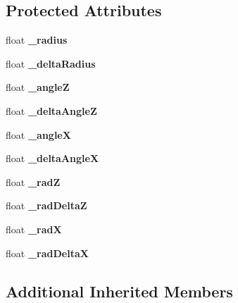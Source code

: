 \subsection*{Protected Attributes}
\begin{DoxyCompactItemize}
\item 
\mbox{\label{classOrbitCamera_a6e7707f0613f465c362f526078937bf9}} 
float {\bfseries \+\_\+radius}
\item 
\mbox{\label{classOrbitCamera_aba33bd3c24fd8be2486f0dd91cf1d0a5}} 
float {\bfseries \+\_\+delta\+Radius}
\item 
\mbox{\label{classOrbitCamera_af1fb2120249728490b1a78d3179fcdb7}} 
float {\bfseries \+\_\+angleZ}
\item 
\mbox{\label{classOrbitCamera_a63c37800f668697950bf7c0a56281823}} 
float {\bfseries \+\_\+delta\+AngleZ}
\item 
\mbox{\label{classOrbitCamera_ab8982680d949fe95e9a8e72366aea6c5}} 
float {\bfseries \+\_\+angleX}
\item 
\mbox{\label{classOrbitCamera_a0667d8b414919bd55b4bca60abc2d7f5}} 
float {\bfseries \+\_\+delta\+AngleX}
\item 
\mbox{\label{classOrbitCamera_a0bc89e833a22aa057f85f8f129cdcfd6}} 
float {\bfseries \+\_\+radZ}
\item 
\mbox{\label{classOrbitCamera_a9c1ffd89420ad984a56541adba35b29e}} 
float {\bfseries \+\_\+rad\+DeltaZ}
\item 
\mbox{\label{classOrbitCamera_adb47310bdc902024445e1729d47367d3}} 
float {\bfseries \+\_\+radX}
\item 
\mbox{\label{classOrbitCamera_a101eaa4a2cbd55dcd7f71ccc8241da51}} 
float {\bfseries \+\_\+rad\+DeltaX}
\end{DoxyCompactItemize}
\subsection*{Additional Inherited Members}


